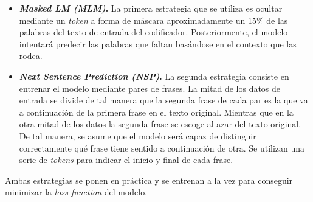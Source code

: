 \begin{itemize}
    \item \textbf{\textit{Masked LM (MLM)}.} La primera estrategia que se utiliza es ocultar mediante un \textit{token} a forma de máscara aproximadamente un 15\% de las palabras del texto de entrada del codificador. Posteriormente, el modelo intentará predecir las palabras que faltan basándose en el contexto que las rodea.
    \item \textbf{\textit{Next Sentence Prediction (NSP)}.} La segunda estrategia consiste en entrenar el modelo mediante pares de frases. La mitad de los datos de entrada se divide de tal manera que la segunda frase de cada par es la que va a continuación de la primera frase en el texto original. Mientras que en la otra mitad de los datos la segunda frase se escoge al azar del texto original. De tal manera, se asume que el modelo será capaz de distinguir correctamente qué frase tiene sentido a continuación de otra. Se utilizan una serie de \textit{tokens} para indicar el inicio y final de cada frase.
\end{itemize}

Ambas estrategias se ponen en práctica y se entrenan a la vez para conseguir minimizar la \textit{loss function} del modelo.